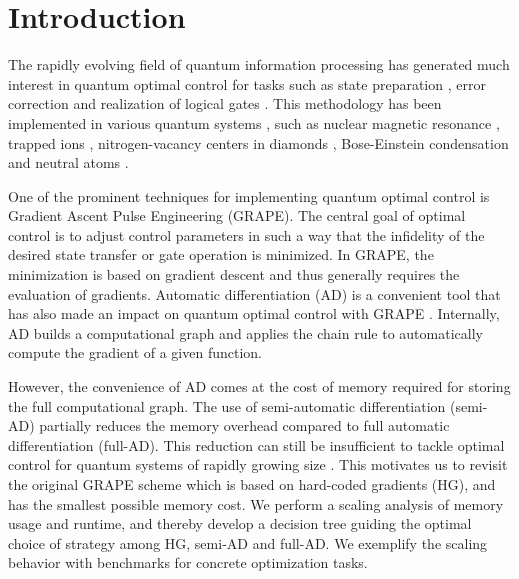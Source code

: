 \section{\label{sec:level1}Introduction}

The rapidly evolving field of quantum information processing has generated much interest in quantum optimal control for tasks such as state preparation  \cite{rojan2014arbitrarystate,bondar2023globally}, error correction \cite{waldherr2014quantumerror,gertler2021protecting} and realization of logical gates \cite{scabdelhafez2020universal,scallen2017optimal,schuang2014optimal,scwerninghaus2021leakage}. This methodology has been implemented in various quantum systems \cite{glaser2015training}, such as nuclear magnetic resonance \cite{nmrbretschneider2012conversion,nmrkehlet2004improving,nmrkhaneja2005optimal,nmrsimon2009optimal,nmrspinachhogben2011spinach,nmrxu2008designing}, trapped ions \cite{timuller2015phonon,tinebendahl2009optimal}, nitrogen-vacancy centers in diamonds \cite{nvangerer2013robust,nvchou2015optimal,nvdolde2014high,nvpoggiali2018optimal,nvpoulsen2021optimal,nvrembold2020introduction,nvyan2021population}, Bose-Einstein condensation  \cite{becamri2019optimal,becmennemann2015optimal,becsorensen2018qengine} and neutral atoms \cite{atomguo2019high,atomrosi2013fast}. 

One of the prominent techniques for implementing quantum optimal control is Gradient Ascent Pulse Engineering (GRAPE). The central goal of optimal control is to adjust control parameters in such a way that the infidelity of the desired state transfer or gate operation is minimized. In GRAPE, the minimization is based on gradient descent and thus generally requires the evaluation of gradients. Automatic differentiation (AD) \cite{baydin2018automatic} is a convenient tool that has also made an impact on quantum optimal control with GRAPE \cite{pacleung2017speedup,pacqoc,abdelhafez2019gradient,grapead}.
Internally, AD builds a computational graph and applies the chain rule to automatically compute the gradient of a given function. 

However, the convenience of AD comes at the cost of memory required for storing the full computational graph. The use of semi-automatic differentiation (semi-AD) \cite{semiadgoerz2022quantum} partially reduces the memory overhead compared to full automatic differentiation (full-AD). This reduction can still be insufficient to tackle optimal control for quantum systems of rapidly growing size \cite{arute2019quantum,gong2021quantum}. This motivates us to revisit the original GRAPE scheme \cite{nmrkhaneja2005optimal} which is based on hard-coded gradients (HG), and has the smallest possible memory cost. We perform a scaling analysis of memory usage and runtime, and thereby develop a decision tree guiding the optimal choice of strategy among HG, semi-AD and full-AD. We exemplify the scaling behavior with benchmarks for concrete optimization tasks.

